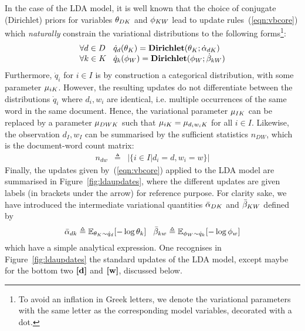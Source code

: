 In the case of the LDA model, it is well known that the choice of conjugate (Dirichlet) priors for variables $\theta_{DK}$ and $\phi_{KW}$ lead to update rules~(\ref{eqn:vbcore}) which {\em naturally} constrain the variational distributions to the following forms\footnote{To avoid an inflation in Greek letters, we denote the variational parameters with the same letter as the corresponding model variables, decorated with a dot.}:
\[
\begin{array}{l@{\hspace{.3cm}}l}
\forall d\in D& \dot{q}_d(\vmDK_K) = \mathbf{Dirichlet}(\vmDK_K;\vvmDK_{dK}) \\
\forall k\in K& \dot{q}_k(\vmKW_W) = \mathbf{Dirichlet}(\vmKW_W;\vvmKW_{kW})
\end{array}
\]
Furthermore, $\dot{q}_i$ for $i\in I$ is by construction a categorical distribution, with some parameter $\mu_{iK}$. However, the resulting updates do not differentiate between the distributions $\dot{q}_i$ where $d_i,w_i$ are identical, i.e. multiple occurrences of the same word in the same document. Hence, the variational parameter $\mu_{IK}$ can be replaced by a parameter $\mu_{DWK}$ such that $\mu_{iK}=\mu_{d_iw_iK}$ for all $i\in I$. Likewise, the observation $d_I,w_I$ can be summarised by the sufficient statistics $n_{DW}$, which is the document-word count matrix:
\begin{eqnarray*}
n_{dw} & \triangleq & |\{i\in I|d_i=d,w_i=w\}|
\end{eqnarray*}
Finally, the updates given by~(\ref{eqn:vbcore}) applied to the LDA model are summarised in Figure~\ref{fig:ldaupdates}, where the different updates are given labels (in brackets under the arrow) for reference purpose. For clarity sake, we have introduced the intermediate variational quantities $\bar{\alpha}_{DK}$ and $\bar{\beta}_{KW}$ defined by
\[
\bar{\alpha}_{dk}\triangleq\mathbb{E}_{\theta_K\sim\dot{q}_d}[-\log\theta_k]
\hspace{.3cm}
\bar{\beta}_{kw}\triangleq\mathbb{E}_{\phi_W\sim\dot{q}_k}[-\log\phi_w]
\]
which have a simple analytical expression. One recognises in Figure~\ref{fig:ldaupdates} the standard updates of the LDA model, except maybe for the bottom two $\textbf{[d]}$ and $\textbf{[w]}$, discussed below.
